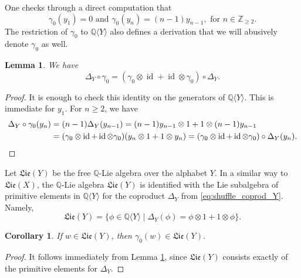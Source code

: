 \documentclass[11pt, a4paper]{amsart}
\newtheorem{lemma}[theorem]{Lemma}
\newtheorem{corollary}[theorem]{Corollary}
\numberwithin{equation}{section}
\theoremstyle{definition}
\newcommand{\Q}{\mathbb{Q}}
\newcommand{\QY}{\Q\langle Y\rangle}
\newcommand{\id}{\operatorname{id}}
\newcommand{\Lie}{\mathfrak{Lie}}
\begin{document}
\noindent One checks through a direct computation that
\[
    \gamma_0(y_1) = 0 \text{ and } \gamma_0(y_n) = (n-1) y_{n-1}, \text{ for } n \in \mathbb{Z}_{\geq 2}.
\]
The restriction of $\gamma_0$ to $\QY$ also defines a derivation that we will abusively denote $\gamma_0$ as well.
\begin{lemma} \label{lem:coder_partial0}
We have 
\[\Delta_Y \circ \gamma_0 = (\gamma_0 \otimes \id + \id \otimes \gamma_0) \circ \Delta_Y.\]
\end{lemma}
\begin{proof}
    It is enough to check this identity on the generators of $\QY$. This is immediate for $y_1$. For $n \geq 2$, we have
    \begin{align*}
        \Delta_Y \circ \gamma_0(y_n) & = (n-1) \Delta_Y(y_{n-1}) = (n-1) y_{n-1} \otimes 1 + 1 \otimes (n-1) y_{n-1} \\
        & = (\gamma_0 \otimes \id + \id \otimes \gamma_0)(y_n \otimes 1 + 1 \otimes y_n) = (\gamma_0 \otimes \id + \id \otimes \gamma_0) \circ \Delta_Y(y_n). \qedhere
    \end{align*}
\end{proof}

Let $\Lie(Y)$ be the free $\Q$-Lie algebra over the alphabet $Y$. In a similar way to $\Lie(X)$, the $\Q$-Lie algebra $\Lie(Y)$ is identified with the Lie subalgebra of primitive elements in $\QY$ for the coproduct $\Delta_Y$ from \eqref{eq:shuffle_coprod_Y}. Namely,
\[
    \Lie(Y) = \{ \phi \in \QY \mid \Delta_Y(\phi) = \phi \otimes 1 + 1 \otimes \phi \}.
\]


\begin{corollary} \label{cor:partial0_preserves_LibY}
    If $w \in \Lie(Y)$, then $\gamma_0(w) \in \Lie(Y)$.
\end{corollary}
\begin{proof}
    It follows immediately from Lemma \ref{lem:coder_partial0}, since $\Lie(Y)$ consists exactly of the primitive elements for $\Delta_Y$.
\end{proof}
\end{document}
